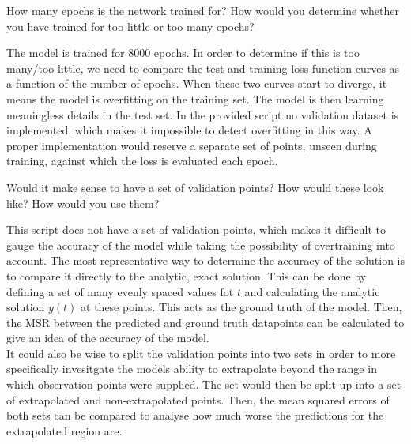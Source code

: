 \documentclass[we,twoside,openright,a4paper,11pt]{uantwerpenbamathesis}
\begin{document}
\begin{tcolorbox}[title=Question 8, colback=blue!10!white, colframe=blue!40!white, sharp corners]
    How many epochs is the network trained for? How would you determine whether you have trained for too little or too many epochs?
\end{tcolorbox}
The model is trained for $8000$ epochs. In order to determine if this is too many/too little, we need to compare the test and training loss function curves as a function of the number of epochs. When these two curves start to diverge, it means the model is overfitting on the training set. The model is then learning meaningless details in the test set. In the provided script no validation dataset is implemented, which makes it impossible to detect overfitting in this way. A proper implementation would reserve a separate set of points, unseen during training, against which the loss is evaluated each epoch.

\begin{tcolorbox}[title=Question 9, colback=blue!10!white, colframe=blue!40!white, sharp corners]
    Would it make sense to have a set of validation points? How would these look like? How would you use them?
\end{tcolorbox}
This script does not have a set of validation points, which makes it difficult to gauge the accuracy of the model while taking the possibility of overtraining into account. The most representative way to determine the accuracy of the solution is to compare it directly to the analytic, exact solution. This can be done by defining a set of many evenly spaced values fot $t$ and calculating the analytic solution $y(t)$ at these points. This acts as the ground truth of the model. Then, the MSR between the predicted and ground truth datapoints can be calculated to give an idea of the accuracy of the model.\\

It could also be wise to split the validation points into two sets in order to more specifically invesitgate the models ability to extrapolate beyond the range in which observation points were supplied. The set would then be split up into a set of extrapolated and non-extrapolated points. Then, the mean squared errors of both sets can be compared to analyse how much worse the predictions for the extrapolated region are.
\end{document}

